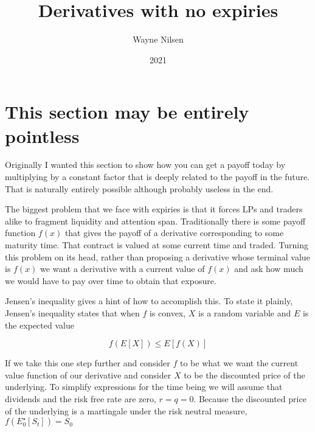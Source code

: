 \documentclass[12pt]{article}
\title{Derivatives with no expiries}
\author{Wayne Nilsen}
\date{2021}
\begin{document}
    \maketitle

    \section{This section may be entirely pointless}

    Originally I wanted this section to show how you can get a payoff today by multiplying by a constant factor that is deeply related to the payoff in the future. That is naturally entirely possible although probably useless in the end.

    The biggest problem that we face with expiries is that it forces LPs and traders alike to fragment liquidity and attention span. Traditionally there is some payoff function $f(x)$ that gives the payoff of a derivative corresponding to some maturity time. That contract is valued at some current time and traded. Turning this problem on its head, rather than proposing a derivative whose terminal value is $f(x)$ we want a derivative with a current value of $f(x)$ and ask how much we would have to pay over time to obtain that exposure.

    Jensen's inequality gives a hint of how to accomplish this. To state it plainly, Jensen's inequality states that when $f$ is convex, $X$ is a random variable and $E$ is the expected value

    $$f(E[X]) \leq E[f(X)]$$

    If we take this one step further and consider $f$ to be what we want the current value function of our derivative and consider $X$ to be the discounted price of the underlying. To simplify expressions for the time being we will assume that dividends and the risk free rate are zero, $r=q=0$. Because the discounted price of the underlying is a martingale under the risk neutral measure, $f(E_0^\star\left[S_t\right]) = S_0$
\end{document}
